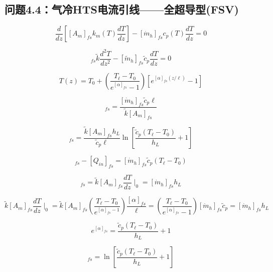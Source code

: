 \subsection{问题4.4：气冷HTS电流引线——全超导型(FSV)}

\begin{equation}%
\frac{d}{dz}\left[[A_m]_{fs}k_m(T)\frac{dT}{dz}\right]-[\dot{m}_h]_{fs}c_p(T)\frac{dT}{dz}=0
\end{equation}

\begin{equation}%
[A_m]_{fs}\tilde{k}\frac{d^2T}{dz^2}-[\tilde{m}_h]_{fs}\tilde{c}_p\frac{dT}{dz}=0
\end{equation}

\begin{equation}%
T(z)=T_0+(\frac{T_\ell-T_0}{e^{[\alpha]_{fs}}-1})[e^{[\alpha]_{fs}(z/\ell)}-1]
\end{equation}

\begin{equation}%
[\alpha]_{fs}=\frac{[\dot{m}_h]_{fs}\tilde{c}_p\ell}{\tilde{k}[A_m]_{fs}}
\end{equation}

\begin{equation}%
[Q_{in}]_{fs}=\frac{\tilde{k}[A_m]_{fs}h_L}{\tilde{c}_p\ell}\ln\left[\frac{\tilde{c}_p(T_\ell-T_0)}{h_L}+1\right]
\end{equation}

\begin{equation}%
[Q_\ell]_{fs}-[Q_{in}]_{fs}=[\dot{m}_h]_{fs}\tilde{c}_p(T_\ell-T_0)
\end{equation}

\begin{equation}
[Q_{in}]_{fs}=\tilde{k}[A_m]_{fs}\frac{dT}{dz}\mid_0=[\dot{m}_h]_{fs}h_L
\end{equation}

\begin{equation}
\tilde{k}[A_m]_{fs}\frac{dT}{dz}\mid_0=\tilde{k}[A_m]_{fs}(\frac{T_\ell-T_0}{e^{[\alpha]_{fs}-1}})\frac{[\alpha]_{fs}}{\ell}
=(\frac{T_\ell-T_0}{e^{[\alpha]_{fs}}-1})[\dot{m}_h]_{fs}\tilde{c}_p=[\dot{m}_h]_{fs}h_L
\end{equation}

\begin{equation}
e^{[\alpha]_{fs}}=\frac{\tilde{c}_p(T_\ell-T_0)}{h_L}+1
\end{equation}

\begin{equation}
[\alpha]_{fs}=\ln\left[\frac{\tilde{c}_p(T_\ell-T_0)}{h_L}+1\right]
\end{equation}


